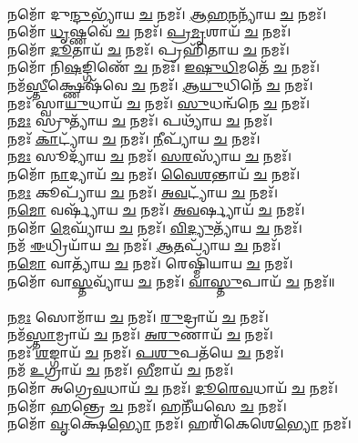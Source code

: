 \\
𑌨𑌮𑍋᳴ 𑌦𑍁\-\ul{𑌨𑍍𑌦𑍁}\-𑌭𑍍𑌯𑌾᳴𑌯 \ul{𑌚} 𑌨𑌮𑌃᳴। \ul{𑌆}\-\-\ul{𑌹}\-\-\ul{𑌨}\-𑌨𑍍𑌯𑌾᳴𑌯 \ul{𑌚} 𑌨𑌮𑌃᳴। \\
𑌨𑌮𑍋᳴ \ul{𑌧𑍃}\-𑌷𑍍𑌣𑌵𑍇᳴ \ul{𑌚} 𑌨𑌮𑌃᳴। \ul{𑌪𑍍𑌰}\-\-\ul{𑌮𑍃}\-𑌶𑌾𑌯᳴ \ul{𑌚} 𑌨𑌮𑌃᳴।\\
𑌨𑌮𑍋᳴ \ul{𑌦𑍂}\-𑌤𑌾𑌯᳴ \ul{𑌚} 𑌨𑌮𑌃᳴। 𑌪𑍍𑌰𑌹𑌿᳴𑌤𑌾𑌯 \ul{𑌚} 𑌨𑌮𑌃᳴। \\
𑌨𑌮𑍋᳴ 𑌨𑌿\-\ul{𑌷}\-𑌙𑍍𑌗𑌿𑌣𑍇᳴ \ul{𑌚} 𑌨𑌮𑌃᳴। \ul{𑌇}\-\-\ul{𑌷𑍁}\-\-\ul{𑌧𑌿}\-𑌮𑌤𑍇᳴ \ul{𑌚} 𑌨𑌮𑌃᳴।\\
𑌨𑌮᳴\-\ul{𑌸𑍍𑌤𑍀}\-𑌕𑍍𑌷𑍍𑌣𑍇𑌷᳴𑌵𑍇 \ul{𑌚} 𑌨𑌮𑌃᳴। \ul{𑌆}\-\-\ul{𑌯𑍁}\-𑌧𑌿𑌨𑍇᳴ \ul{𑌚} 𑌨𑌮𑌃᳴। \\
𑌨𑌮𑌃᳴ 𑌸𑍍𑌵𑌾\-\ul{𑌯𑍁}\-𑌧𑌾𑌯᳴ \ul{𑌚} 𑌨𑌮𑌃᳴। \ul{𑌸𑍁}\-𑌧𑌨𑍍𑌵᳴𑌨𑍇 \ul{𑌚} 𑌨𑌮𑌃᳴।\\
𑌨\-\ul{𑌮𑌃} 𑌸𑍍𑌰𑍁𑌤𑍍𑌯𑌾᳴𑌯 \ul{𑌚} 𑌨𑌮𑌃᳴। 𑌪𑌥𑍍𑌯𑌾᳴𑌯 \ul{𑌚} 𑌨𑌮𑌃᳴। \\
𑌨𑌮𑌃᳴ \ul{𑌕𑌾}\-𑌟𑍍𑌯𑌾᳴𑌯 \ul{𑌚} 𑌨𑌮𑌃᳴। \ul{𑌨𑍀}\-𑌪𑍍𑌯𑌾᳴𑌯 \ul{𑌚} 𑌨𑌮𑌃᳴।\\
𑌨\-\ul{𑌮𑌃} 𑌸𑍂𑌦𑍍𑌯𑌾᳴𑌯 \ul{𑌚} 𑌨𑌮𑌃᳴। \ul{𑌸}\-\-\ul{𑌰}\-𑌸𑍍𑌯𑌾᳴𑌯 \ul{𑌚} 𑌨𑌮𑌃᳴। \\
𑌨𑌮𑍋᳴ \ul{𑌨𑌾}\-𑌦𑍍𑌯𑌾𑌯᳴ \ul{𑌚} 𑌨𑌮𑌃᳴। \ul{𑌵𑍈}\-\-\ul{𑌶}\-𑌨𑍍𑌤𑌾𑌯᳴ \ul{𑌚} 𑌨𑌮𑌃᳴।  \\
𑌨\-\ul{𑌮𑌃} 𑌕𑍂𑌪𑍍𑌯𑌾᳴𑌯 \ul{𑌚} 𑌨𑌮𑌃᳴। \ul{𑌅}\-\-\ul{𑌵}\-𑌟𑍍𑌯𑌾᳴𑌯 \ul{𑌚} 𑌨𑌮𑌃᳴। \\
𑌨\-\ul{𑌮𑍋} 𑌵𑌰𑍍𑌷𑍍𑌯𑌾᳴𑌯 \ul{𑌚} 𑌨𑌮𑌃᳴। \ul{𑌅}\-\-\ul{𑌵}\-𑌰𑍍𑌷𑍍𑌯𑌾𑌯᳴ \ul{𑌚} 𑌨𑌮𑌃᳴। \\
𑌨𑌮𑍋᳴ \ul{𑌮𑍇}\-𑌘𑍍𑌯𑌾᳴𑌯 \ul{𑌚} 𑌨𑌮𑌃᳴। \ul{𑌵𑌿}\-\-\ul{𑌦𑍍𑌯𑍁}\-𑌤𑍍𑌯𑌾᳴𑌯 \ul{𑌚} 𑌨𑌮𑌃᳴।\\
𑌨𑌮᳴ \ul{𑌈}\-𑌧𑍍𑌰𑌿𑌯𑌾᳴𑌯 \ul{𑌚} 𑌨𑌮𑌃᳴। \ul{𑌆}\-\-\ul{𑌤}\-𑌪𑍍𑌯𑌾᳴𑌯 \ul{𑌚} 𑌨𑌮𑌃᳴।\\
𑌨\-\ul{𑌮𑍋} 𑌵𑌾𑌤𑍍𑌯𑌾᳴𑌯 \ul{𑌚} 𑌨𑌮𑌃᳴। 𑌰𑍇𑌷𑍍𑌮𑌿᳴𑌯𑌾𑌯 \ul{𑌚} 𑌨𑌮𑌃᳴। \\
𑌨𑌮𑍋᳴ 𑌵𑌾\-\ul{𑌸𑍍𑌤}\-𑌵𑍍𑌯𑌾᳴𑌯 \ul{𑌚} 𑌨𑌮𑌃᳴। \ul{𑌵𑌾}\-\-\ul{𑌸𑍍𑌤𑍁}\-𑌪𑌾𑌯᳴ \ul{𑌚} 𑌨𑌮𑌃᳴॥ \\
\\
𑌨\-\ul{𑌮𑌃} 𑌸𑍋𑌮𑌾᳴𑌯 \ul{𑌚} 𑌨𑌮𑌃᳴। \ul{𑌰𑍁}\-𑌦𑍍𑌰𑌾𑌯᳴ \ul{𑌚} 𑌨𑌮𑌃᳴। \\
𑌨𑌮᳴\-\ul{𑌸𑍍𑌤𑌾}\-𑌮𑍍𑌰𑌾𑌯᳴ \ul{𑌚} 𑌨𑌮𑌃᳴। \ul{𑌅}\-\-\ul{𑌰𑍁}\-𑌣𑌾𑌯᳴ \ul{𑌚} 𑌨𑌮𑌃᳴।\\
𑌨𑌮𑌃᳴ \ul{𑌶}\-𑌙𑍍𑌗𑌾𑌯᳴ \ul{𑌚} 𑌨𑌮𑌃᳴। \ul{𑌪}\-\-\ul{𑌶𑍁}\-𑌪𑌤᳴𑌯𑍇 \ul{𑌚} 𑌨𑌮𑌃᳴। \\
𑌨𑌮᳴ \ul{𑌉}\-𑌗𑍍𑌰𑌾𑌯᳴ \ul{𑌚} 𑌨𑌮𑌃᳴। \ul{𑌭𑍀}\-𑌮𑌾𑌯᳴ \ul{𑌚} 𑌨𑌮𑌃᳴। \\
𑌨𑌮𑍋᳴ 𑌅𑌗𑍍𑌰𑍇\-\ul{𑌵}\-𑌧𑌾𑌯᳴ \ul{𑌚} 𑌨𑌮𑌃᳴। \ul{𑌦𑍂}\-\-\ul{𑌰𑍇}\-\-\ul{𑌵}\-𑌧𑌾𑌯᳴ \ul{𑌚} 𑌨𑌮𑌃᳴।\\
𑌨𑌮𑍋᳴ \ul{𑌹}\-𑌨𑍍𑌤𑍍𑌰𑍇 \ul{𑌚} 𑌨𑌮𑌃᳴। 𑌹𑌨𑍀᳴𑌯𑌸𑍇 \ul{𑌚} 𑌨𑌮𑌃᳴। \\
𑌨𑌮𑍋᳴ \ul{𑌵𑍃}\-𑌕𑍍𑌷𑍇\-\ul{𑌭𑍍𑌯𑍋} 𑌨𑌮𑌃᳴। 𑌹𑌰𑌿᳴𑌕𑍇𑌶𑍇\-\ul{𑌭𑍍𑌯𑍋} 𑌨𑌮𑌃᳴।\\
